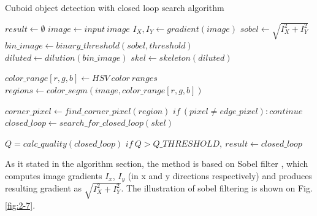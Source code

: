 \documentclass{ctuthesis}
\begin{document}
\begin{algorithm}
\caption{Cuboid object detection with closed loop search algorithm}\label{clloop}
\begin{algorithmic}[1]
\State $result \gets \emptyset$
\State $image \gets input\ image$
\State $I_X, I_Y \gets gradient(image)$
\State $sobel \gets \sqrt{I_X^2 + I_Y^2}$
\State $bin\_image \gets binary\_threshold(sobel, threshold)$
\State $diluted \gets dilution(bin\_image)$
\State $skel \gets skeleton(diluted)$

\State $color\_range[r,g,b] \gets HSV\ color\ ranges$
\State $regions \gets color\_segm(image, color\_range[r,g,b])$

\State $corner\_pixel \gets find\_corner\_pixel(region)$
\State $if\ (pixel \neq edge\_pixel): continue$
\State $closed\_loop \gets search\_for\_closed\_loop(skel)$

\State $Q = calc\_quality(closed\_loop)$
\State $if\ Q > Q\_THRESHOLD,\ result \gets closed\_loop $
\EndFor
\EndFor
\EndFor
\EndFor

\end{algorithmic}
\end{algorithm}


As it stated in the algorithm section, the method is based on Sobel filter \cite{sob}, which computes image gradients $I_x$, $I_y$ (in x and y directions respectively) and produces resulting gradient as $\sqrt{I_X^2 + I_Y^2}$. The illustration of sobel filtering is shown on Fig.\ref{fig:2-7}.
\end{document}
